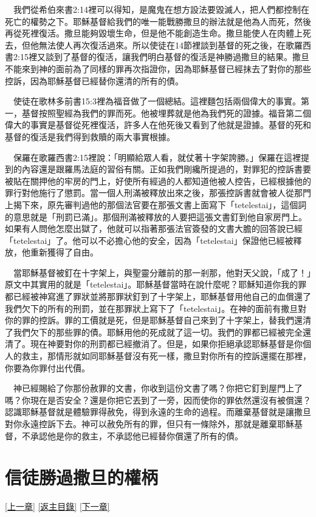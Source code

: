 \documentclass{book}
\begin{document}
　我們從希伯來書2:14裡可以得知，是魔鬼在想方設法要毀滅人，把人們都控制在死亡的權勢之下。耶穌基督給我們的唯一能戰勝撒旦的辦法就是他為人而死，然後再從死裡復活。撒旦能夠毀壞生命，但是他不能創造生命。撒旦能使人在肉體上死去，但他無法使人再次復活過來。所以使徒在14節裡談到基督的死之後，在歌羅西書2:15裡又談到了基督的復活，讓我們明白基督的復活是神勝過撒旦的結果。撒旦不能來到神的面前為了同樣的罪再次指證你，因為耶穌基督已經抹去了對你的那些控訴，因為耶穌基督已經替你還清的所有的債。

　使徒在歌林多前書15:3裡為福音做了一個總結。這裡麵包括兩個偉大的事實。第一，基督按照聖經為我們的罪而死。他被埋葬就是他為我們死的證據。福音第二個偉大的事實是基督從死裡復活，許多人在他死後又看到了他就是證據。基督的死和基督的復活是我們得到救贖的兩大事實根據。

　保羅在歌羅西書2:15裡說：「明顯給眾人看，就仗著十字架誇勝。」保羅在這裡提到的內容還是跟羅馬法庭的習俗有關。正如我們剛纔所提過的，對罪犯的控訴書要被貼在關押他的牢房的門上，好使所有經過的人都知道他被人控告，已經根據他的罪行對他施行了懲罰。當一個人刑滿被釋放出來之後，那張控訴書就會被人從那門上揭下來，原先審判過他的那個法官要在那張文書上面寫下「tetelestai」，這個詞的意思就是「刑罰已滿」。那個刑滿被釋放的人要把這張文書釘到他自家房門上。如果有人問他怎麼出獄了，他就可以指著那張法官簽發的文書大膽的回答說已經「tetelestai」了。他可以不必擔心他的安全，因為「tetelestai」保證他已經被釋放，他重新獲得了自由。

　當耶穌基督被釘在十字架上，與聖靈分離前的那一剎那，他對天父說，「成了！」原文中其實用的就是「tetelestai」。耶穌基督當時在說什麼呢？耶穌知道你我的罪都已經被神寫進了罪狀並將那罪狀釘到了十字架上，耶穌基督用他自己的血償還了我們欠下的所有的刑罰，並在那罪狀上寫下了「tetelestai」。在神的面前有撒旦對你的罪的控訴。罪的工價就是死，但是耶穌基督自己來到了十字架上，替我們還清了我們欠下的那些罪的債。耶穌用他的死成就了這一切。我們的罪都已經被完全還清了。現在神要對你的刑罰都已經撤消了。但是，如果你拒絕承認耶穌基督是你個人的救主，那情形就如同耶穌基督沒有死一樣，撒旦對你所有的控訴還擺在那裡，你要為你罪付出代價。

　神已經賜給了你那份赦罪的文書，你收到這份文書了嗎？你把它釘到屋門上了嗎？你現在是否安全？還是你把它丟到了一旁，因而使你的罪依然還沒有被償還？認識耶穌基督就是體驗罪得赦免，得到永遠的生命的過程。而離棄基督就是讓撒旦對你永遠控訴下去。神可以赦免所有的罪，但只有一條除外，那就是離棄耶穌基督，不承認他是你的救主，不承認他已經替你償還了所有的債。

\chapter{信徒勝過撒旦的權柄}
\label{sec:ch17}
\hyperref[sec:ch16]{[上一章]}
\hyperlink{toc}{[返主目錄]}
\hyperref[sec:ch18]{[下一章]}
\end{document}
